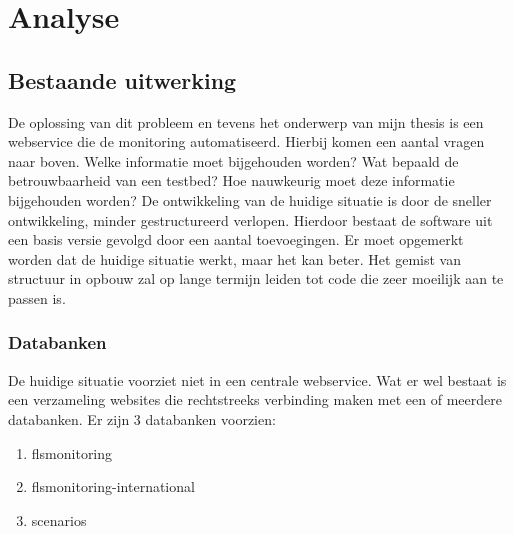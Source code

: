 \newpage
\chapter{Analyse}
\section{Bestaande uitwerking}
\npar
De oplossing van dit probleem en tevens het onderwerp van mijn thesis is een webservice die de monitoring automatiseerd. Hierbij komen een aantal vragen naar boven. Welke informatie moet bijgehouden worden? 
Wat bepaald de betrouwbaarheid van een testbed? Hoe nauwkeurig moet deze informatie bijgehouden worden? 
\npar
De ontwikkeling van de huidige situatie is door de sneller ontwikkeling, minder gestructureerd verlopen.
Hierdoor bestaat de software uit een basis versie gevolgd door een aantal  toevoegingen. Er moet opgemerkt worden dat de huidige situatie werkt, maar het kan beter. Het gemist van structuur in opbouw zal op lange termijn leiden tot code die zeer moeilijk aan te passen is.
\subsection{Databanken}
\npar
De huidige situatie voorziet niet in een centrale webservice.
Wat er wel bestaat is een verzameling websites die rechtstreeks verbinding maken met een of meerdere databanken. Er zijn 3 databanken voorzien:
\begin{enumerate}
\item flsmonitoring
\item flsmonitoring-international
\item scenarios
\end{enumerate}
\newpage
